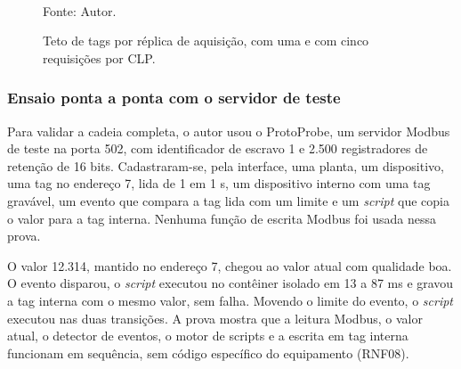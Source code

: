 \begin{figure}[H]
    \centering
    \caption{Teto de tags por réplica de aquisição, com uma e com cinco requisições por CLP.}
    \label{fig:cap7_aquisicao}
    \vspace{0.4cm}
    \vspace{0.2cm} \\
    Fonte: Autor.
\end{figure}

\subsubsection{Ensaio ponta a ponta com o servidor de teste}

\par Para validar a cadeia completa, o autor usou o ProtoProbe, um servidor Modbus de teste na porta 502, com identificador de escravo 1 e 2.500 registradores de retenção de 16 bits. Cadastraram-se, pela interface, uma planta, um dispositivo, uma tag no endereço 7, lida de 1 em 1 s, um dispositivo interno com uma tag gravável, um evento que compara a tag lida com um limite e um \emph{script} que copia o valor para a tag interna. Nenhuma função de escrita Modbus foi usada nessa prova.

\par O valor 12.314, mantido no endereço 7, chegou ao valor atual com qualidade boa. O evento disparou, o \emph{script} executou no contêiner isolado em 13 a 87 ms e gravou a tag interna com o mesmo valor, sem falha. Movendo o limite do evento, o \emph{script} executou nas duas transições. A prova mostra que a leitura Modbus, o valor atual, o detector de eventos, o motor de scripts e a escrita em tag interna funcionam em sequência, sem código específico do equipamento (RNF08).

